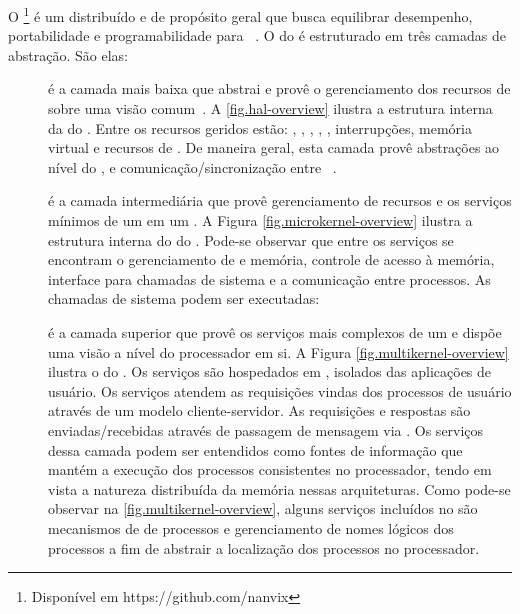 O \nanvix\footnote{Disponível em https://github.com/nanvix} é um \os distribuído e de propósito geral que busca equilibrar desempenho, portabilidade e programabilidade para \lws~\cite{penna:sbesc19}. O  do \nanvix é estruturado em três camadas de abstração. São elas:
\begin{description}
    \item [\nanvix \hal]
         é a camada mais baixa que abstrai e provê o gerenciamento dos recursos de \hardware sobre uma visão comum~\cite{penna:hal}. A \autoref{fig.hal-overview} ilustra a estrutura interna da \hal do \nanvix. Entre os recursos geridos estão: \cores, \tlbs, \cache, \mmu, \noc, interrupções, memória virtual e recursos de \io. De maneira geral, esta camada provê abstrações ao nível do \core, \cluster e comunicação/sincronização entre \clusters~\cite{penna:thesis}.
    \item [\nanvix \Microkernel]
        é a camada intermediária que provê gerenciamento de recursos e os serviços mínimos de um \os em um \cluster. A Figura \ref{fig.microkernel-overview} ilustra a estrutura interna do \microkernel do \nanvix. Pode-se observar que entre os serviços se encontram o gerenciamento de \threads e memória, controle de acesso à memória, interface para chamadas de sistema e a comunicação entre processos. As chamadas de sistema podem ser executadas:
    \item [\nanvix \Multikernel]
        é a camada superior que provê os serviços mais complexos de um \os e dispõe uma visão a nível do processador em si. A Figura \ref{fig.multikernel-overview} ilustra o \multikernel do \nanvix. Os serviços são hospedados em \ioclusters, \ie isolados das aplicações de usuário. Os serviços atendem as requisições vindas dos processos de usuário através de um modelo cliente-servidor. As requisições e respostas são enviadas/recebidas através de passagem de mensagem via \noc. Os serviços dessa camada podem ser entendidos como fontes de informação que mantém a execução dos processos consistentes no processador, tendo em vista a natureza distribuída da memória nessas arquiteturas. Como pode-se observar na \autoref{fig.multikernel-overview}, alguns serviços incluídos no \nanvix são mecanismos de \spawn de processos e gerenciamento de nomes lógicos dos processos a fim de abstrair a localização dos processos no processador. 
\end{description}

